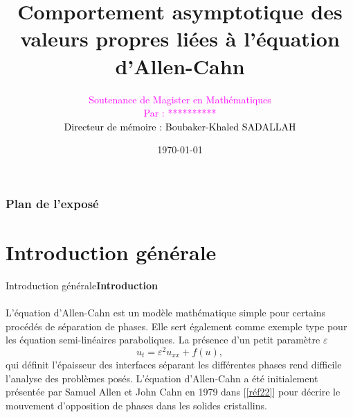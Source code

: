 \documentclass[mathserif,10pt]{beamer}
\author{\textcolor{magenta} {
				Soutenance de Magister en Mathématiques}\\
				\textcolor{magenta} {Par : **********}\\
				\textcolor{black} {Directeur de mémoire : Boubaker-Khaled SADALLAH\\}}
\title{\textbf{ Comportement asymptotique des valeurs propres liées à l'équation d'Allen-Cahn} }
\institute{\'Ecole Normale Supérieure\\
Kouba, Alger}
\date{\today}
\begin{document}
\begin{frame}
\titlepage
\end{frame}

\begin{frame}\transglitter[duration=2]
\frametitle{Plan de l'exposé} 
\tableofcontents \pause
\end{frame}
\section{Introduction générale}
\begin{frame}{}\transdissolve[duration = 1]
\begin{center}
\end{center}
\end{frame}
\begin{frame}{Introduction générale}\transglitter[duration=1]
\textbf{Introduction}\\ \ \\
L'équation d'Allen-Cahn  est un modèle mathématique simple pour certains procédés de séparation de phases. Elle sert également comme  exemple type pour les équation semi-linéaires paraboliques. La présence d'un petit paramètre  $ \varepsilon$ \\
$$u_{t}= \varepsilon^{2}u_{xx}+ f(u), $$ 
qui définit l'épaisseur des interfaces séparant les différentes phases rend difficile l'analyse des problèmes posés.
 L'équation d'Allen-Cahn a été initialement présentée par Samuel  Allen et John  Cahn  en 1979  dans [\ref{réf22}] pour décrire le mouvement d'opposition de phases dans les solides cristallins.
\end{frame}
\end{document}
